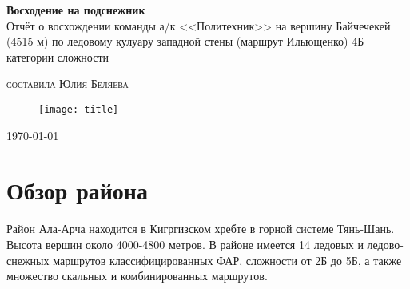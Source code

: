 \documentclass[fleqn, 10pt]{extarticle}
\begin{document}

\begin{titlepage}
	\clearpage\thispagestyle{empty}
	\begin{center} %
		
		\vfill

		{\LARGE\textbf{Восходение на подснежник}\\
			\large{Отчёт о восхождении команды а/к <<Политехник>> на вершину Байчечекей (4515 м)
			по ледовому кулуару западной стены (маршрут Ильющенко) 4Б категории сложности}} %

		\vspace{50pt} %

		{\textsc{составила Юлия Беляева}} %

		\vspace{40pt} %

		\begin{figure}[ht]
			\centering
			\texttt{[image: title]}
		\end{figure}
		
		\vfill

		\today
	\end{center}
\end{titlepage}


\newpage\tableofcontents\newpage

\section{Обзор района}
	Район Ала-Арча находится в Кигргизском хребте в горной системе Тянь-Шань. Высота вершин около 4000-4800 метров. В районе имеется 14 ледовых и ледово-снежных маршрутов классифицированных ФАР,
	сложности от 2Б до 5Б, а также множество скальных и комбинированных маршрутов.
	
\end{document}
